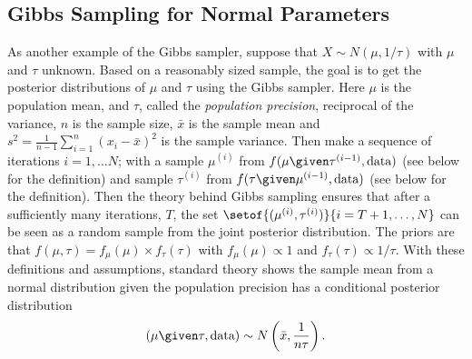 \documentclass[12pt]{article}
\begin{document}
\subsection*{Gibbs Sampling for Normal Parameters}

As another example of the Gibbs sampler, suppose that \( X \sim N(\mu,
1/\tau) \) with \( \mu \) and \( \tau \) unknown.  Based on a reasonably
sized sample, the goal is to get the posterior distributions of \( \mu \)
and \( \tau \) using the Gibbs sampler.  Here \( \mu \) is the
population mean, and \( \tau \), called the \emph{population precision},%
reciprocal of the variance, \( n \) is the sample size, \( \bar{x} \) is
the sample mean and \( s^2 = \frac{1}{n-1} \sum\limits_{i=1}^n (x_i -
\bar{x})^2 \) is the sample variance.  Then make a sequence of
iterations \( i = 1, \dots N \); with a sample \( \mu^{(i)} \) from \( f
(\mu \given \tau^{(i-1)}, \text{data}) \) (see below for the definition)
and sample \( \tau^{(i)} \) from \( f(\tau \given \mu^{(i-1)}, \text{data})
\) (see below for the definition).  Then the theory behind Gibbs
sampling ensures that after a sufficiently many iterations, \( T \), the
set \( \setof{(\mu^{(i)}, \tau^{(i)})}{i = T+1, \dots, N} \) can be seen
as a random sample from the joint posterior distribution. The priors are
that \( f(\mu, \tau) = f_{\mu}(\mu) \times f_{\tau}(\tau) \) with \( f_{\mu}
(\mu) \propto 1 \) and \( f_{\tau}(\tau) \propto 1/\tau \).  With these
definitions and assumptions, standard theory shows the sample mean from
a normal distribution given the population precision has a conditional
posterior distribution
\[
    (\mu \given \tau, \text{data}) \sim N\left(\bar{x}, \frac{1} {n \tau}
    \right).
\]
\end{document}
